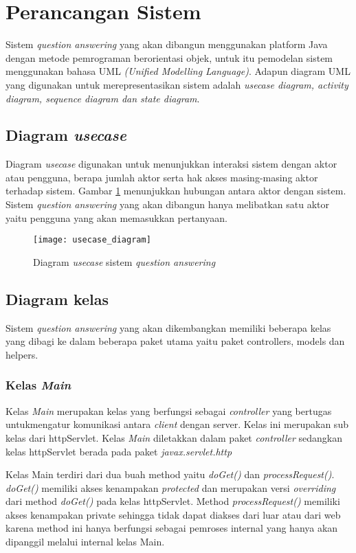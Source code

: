 \section{Perancangan Sistem}
Sistem \emph{question answering} yang akan dibangun menggunakan platform Java dengan metode pemrograman berorientasi objek, untuk itu pemodelan sistem menggunakan bahasa UML \emph{(Unified Modelling Language)}. Adapun diagram UML yang digunakan untuk merepresentasikan sistem adalah \emph{usecase diagram, activity diagram, sequence diagram dan state diagram}. 

\subsection{Diagram \emph{usecase}}
Diagram \emph{usecase} digunakan untuk menunjukkan interaksi sistem dengan aktor atau pengguna, berapa jumlah aktor serta hak akses masing-masing aktor terhadap sistem. Gambar \ref{fig:usecase_diagram} menunjukkan hubungan antara aktor dengan sistem. Sistem \emph{question answering} yang akan dibangun hanya melibatkan satu aktor yaitu pengguna yang akan memasukkan pertanyaan.
\begin{figure}[h]
    \centering
    \texttt{[image: usecase\_diagram]}
    \caption{Diagram \emph{usecase} sistem \emph{question answering}}
    \label{fig:usecase_diagram}
\end{figure}

\subsection{Diagram kelas}
Sistem \emph{question answering} yang akan dikembangkan memiliki beberapa kelas yang dibagi ke dalam beberapa paket utama yaitu paket controllers, models dan helpers.

\subsubsection{Kelas \emph{Main}}
Kelas \emph{Main} merupakan kelas yang berfungsi sebagai \emph{controller} yang bertugas untukmengatur komunikasi antara \emph{client} dengan server. Kelas ini merupakan sub kelas dari httpServlet. Kelas \emph{Main} diletakkan dalam paket \emph{controller} sedangkan kelas httpServlet berada pada paket \emph{javax.servlet.http}

Kelas Main terdiri dari dua buah method yaitu \emph{doGet()} dan \emph{processRequest()}. \emph{doGet()} memiliki akses kenampakan \emph{protected} dan merupakan versi \emph{overriding} dari method \emph{doGet()} pada kelas httpServlet. Method \emph{processRequest()} memiliki akses kenampakan private sehingga tidak dapat diakses dari luar atau dari web karena method ini hanya berfungsi sebagai pemroses internal yang hanya akan dipanggil melalui internal kelas Main.


